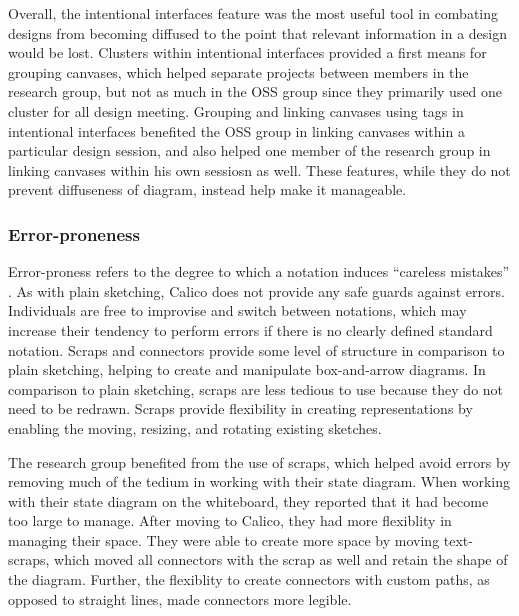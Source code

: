 Overall, the intentional interfaces feature was the most useful tool in combating designs from becoming diffused to the point that relevant information in a design would be lost. Clusters within intentional interfaces provided a first means for grouping canvases, which helped separate projects between members in the research group, but not as much in the OSS group since they primarily used one cluster for all design meeting. Grouping and linking canvases using tags in intentional interfaces benefited the OSS group in linking canvases within a particular design session, and also helped one member of the research group in linking canvases within his own sessiosn as well. These features, while they do not prevent diffuseness of diagram, instead help make it manageable.

%

\subsubsection{Error-proneness}

Error-proness refers to the degree to which a notation induces ``careless mistakes'' \cite{Petre2013BookChapter}. As with plain sketching, Calico does not provide any safe guards against errors. Individuals are free to improvise and switch between notations, which may increase their tendency to perform errors if there is no clearly defined standard notation. Scraps and connectors provide some level of structure in comparison to plain sketching, helping to create and manipulate box-and-arrow diagrams. In comparison to plain sketching, scraps are less tedious to use because they do not need to be redrawn. Scraps provide flexibility in creating representations by enabling the moving, resizing, and rotating existing sketches.

The research group benefited from the use of scraps, which helped avoid errors by removing much of the tedium in working with their state diagram. When working with their state diagram on the whiteboard, they reported that it had become too large to manage. After moving to Calico, they had more flexiblity in managing their space. They were able to create more space by moving text-scraps, which moved all connectors with the scrap as well and retain the shape of the diagram. Further, the flexiblity to create connectors with custom paths, as opposed to straight lines, made connectors more legible. 

